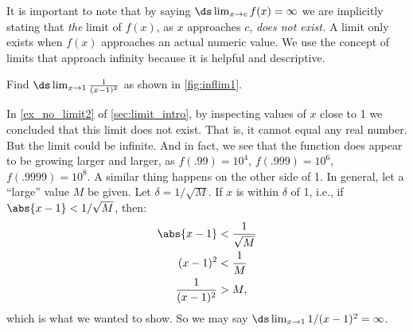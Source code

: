 It is important to note that by saying $\ds \lim_{x\to c}f(x) = \infty$ we are implicitly stating that \emph{the} limit of $f(x)$, as $x$ approaches $c$, \emph{does not exist.} A limit only exists when $f(x)$ approaches an actual numeric value. We use the concept of limits that approach infinity because it is helpful and descriptive.


\begin{example}\label{ex_inflim1}%
Find $\ds \lim_{x\to1}\frac1{(x-1)^2}$ as shown in \autoref{fig:inflim1}.

\solution
In \autoref{ex_no_limit2} of \autoref{sec:limit_intro}, by inspecting values of $x$ close to 1 we concluded that this limit does not exist.  That is, it cannot equal any real number.  But the limit could be infinite.  And in fact, we see that the function does appear to be growing larger and larger, as $f(.99)=10^4$, $f(.999)=10^6$, $f(.9999)=10^8$.  A similar thing happens on the other side of 1.  In general, let a ``large'' value $M$ be given. Let $\delta=1/\sqrt{M}$. If $x$ is within $\delta$ of 1, i.e., if $\abs{x-1}<1/\sqrt{M}$, then:\vspace{-.5\baselineskip}
	\begin{align*}
	\abs{x-1} &< \frac{1}{\sqrt{M}} \\
	(x-1)^2 &< \frac{1}{M}\\
	\frac{1}{(x-1)^2} &> M,
	\end{align*}
	which is what we wanted to show.  So we may say $\ds\lim_{x\rightarrow 1}1/{(x-1)^2}=\infty$.
\end{example}

